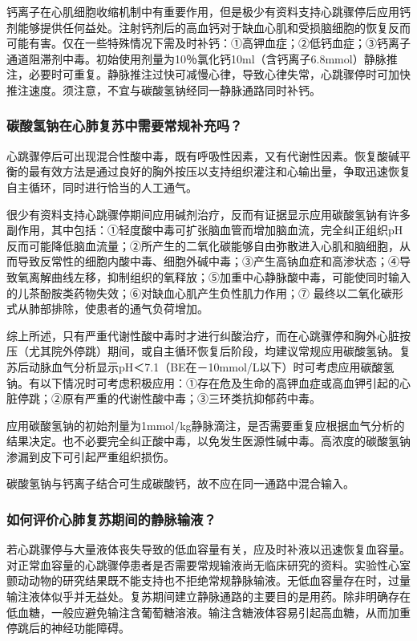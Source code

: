 钙离子在心肌细胞收缩机制中有重要作用，但是极少有资料支持心跳骤停后应用钙剂能够提供任何益处。注射钙剂后的高血钙对于缺血心肌和受损脑细胞的恢复反而可能有害。仅在一些特殊情况下需及时补钙：①高钾血症；②低钙血症；③钙离子通道阻滞剂中毒。初始使用剂量为10％氯化钙10ml（含钙离子6.8mmol）静脉推注，必要时可重复。静脉推注过快可减慢心律，导致心律失常，心跳骤停时可加快推注速度。须注意，不宜与碳酸氢钠经同一静脉通路同时补钙。

\subsubsection{碳酸氢钠在心肺复苏中需要常规补充吗？}

心跳骤停后可出现混合性酸中毒，既有呼吸性因素，又有代谢性因素。恢复酸碱平衡的最有效方法是通过良好的胸外按压以支持组织灌注和心输出量，争取迅速恢复自主循环，同时进行恰当的人工通气。

很少有资料支持心跳骤停期间应用碱剂治疗，反而有证据显示应用碳酸氢钠有许多副作用，其中包括：①轻度酸中毒可扩张脑血管而增加脑血流，完全纠正组织pH反而可能降低脑血流量；②所产生的二氧化碳能够自由弥散进入心肌和脑细胞，从而导致反常性的细胞内酸中毒、细胞外碱中毒；③产生高钠血症和高渗状态；④导致氧离解曲线左移，抑制组织的氧释放；⑤加重中心静脉酸中毒，可能使同时输入的儿茶酚胺类药物失效；⑥对缺血心肌产生负性肌力作用；⑦
最终以二氧化碳形式从肺部排除，使患者的通气负荷增加。

综上所述，只有严重代谢性酸中毒时才进行纠酸治疗，而在心跳骤停和胸外心脏按压（尤其院外停跳）期间，或自主循环恢复后阶段，均建议常规应用碳酸氢钠。复苏后动脉血气分析显示pH＜7.1（BE在－10mmol/L以下）时可考虑应用碳酸氢钠。有以下情况时可考虑积极应用：①存在危及生命的高钾血症或高血钾引起的心脏停跳；②原有严重的代谢性酸中毒；③三环类抗抑郁药中毒。

应用碳酸氢钠的初始剂量为1mmol/kg静脉滴注，是否需要重复应根据血气分析的结果决定。也不必要完全纠正酸中毒，以免发生医源性碱中毒。高浓度的碳酸氢钠渗漏到皮下可引起严重组织损伤。

碳酸氢钠与钙离子结合可生成碳酸钙，故不应在同一通路中混合输入。

\subsubsection{如何评价心肺复苏期间的静脉输液？}

若心跳骤停与大量液体丧失导致的低血容量有关，应及时补液以迅速恢复血容量。对正常血容量的心跳骤停患者是否需要常规输液尚无临床研究的资料。实验性心室颤动动物的研究结果既不能支持也不拒绝常规静脉输液。无低血容量存在时，过量输注液体似乎并无益处。复苏期间建立静脉通路的主要目的是用药。除非明确存在低血糖，一般应避免输注含葡萄糖溶液。输注含糖液体容易引起高血糖，从而加重停跳后的神经功能障碍。

